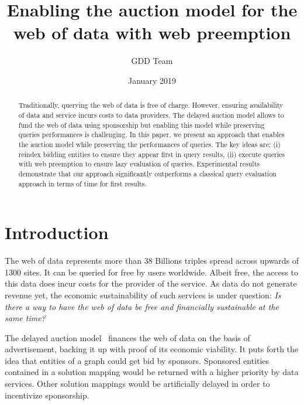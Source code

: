\documentclass[runningheads]{llncs}
\begin{document}
\title{Enabling the auction model for the web of data with web preemption}
%
\author{GDD Team}
%


\date{January 2019}

\maketitle

\begin{abstract}

  Traditionally, querying the web of data is free of charge.
  However, ensuring availability of data and service  incurs costs
  to data  providers. The delayed auction model allows to fund the web of
  data using sponsorship but enabling this  model 
  while preserving queries performances  is challenging.
%
  In this paper, we present an approach that enables the auction model
  while preserving the performances of queries. The key ideas are: (i)
   reindex bidding entities to ensure they appear first in query
  results, (ii)  execute queries with web preemption to ensure lazy
  evaluation of queries. Experimental results demonstrate that our approach
  significantly outperforms a classical query evaluation  approach in terms of time for first
  results.
\end{abstract}

\section{Introduction}

The web of data represents more than 38 Billions triples spread
across upwards of 1300 sites.  It can be queried for free by users
worldwide. Albeit free, the access to this data does incur costs for
the provider of the service. As data do not generate revenue yet, the
economic sustainability of such services is under question: \textit{Is
  there a way to have the web of data be free and financially
  sustainable at the same time?}

The delayed auction model~\cite{DBLP:conf/www/GrubenmannBMS18} finances
the web of data on the basis of advertisement, backing it up with
proof of its economic viability. It puts forth the idea that entities
of a graph could get bid by sponsors. Sponsored entities contained in
a solution mapping would be returned with a higher priority by data
services.  Other solution mappings would be artificially delayed in
order to incentivize sponsorship. 
\end{document}
